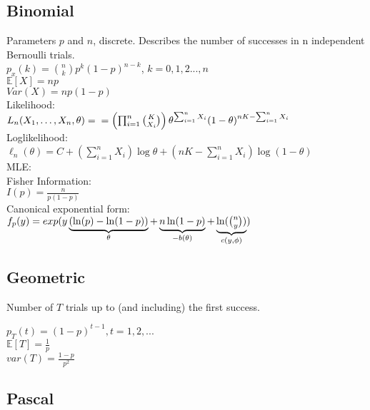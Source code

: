 \subsection*{Binomial}
Parameters $p$ and $n$, discrete. Describes the number of successes
in n independent Bernoulli trials.\\

$p_x(k) = {\binom{n}{k}} {p}^{k} (1-p )^{n-k}$, $k=0,1,2..., n$\\

$\mathbb{E}[X]=np$\\

$Var(X)= np(1-p)$ \\

Likelihood:\\

$\displaystyle  L_ n(X_1, \ldots , X_ n, \theta ) =\\
= \left( \prod _{i = 1}^ n \binom {K}{X_ i} \right) \theta ^{\sum _{i = 1}^ n X_ i} (1 - \theta )^{nK - \sum _{i = 1}^ n X_ i }$\\

Loglikelihood:\\

$\ell_n (\theta) = C + \left( \sum _{i = 1}^ n X_ i \right) \log \theta + \left( nK - \sum _{i = 1}^ n X_ i \right) \log (1 - \theta )$\\

MLE:\\


Fisher Information:\\

$I(p) = \frac{n}{p(1-p)}$\\

Canonical exponential form:\\

$f_ p(y) =\\  
exp (y \underbrace{(\ln (p)-\ln (1-p))}_{\theta } + \underbrace{n\ln (1-p)}_{-b(\theta )} +\underbrace{\ln(\binom {n}{y})}_{c(y,\phi )} )$

\subsection*{Geometric}
Number of $T$ trials up to (and including) the first success. 

$p_T(t) = (1-p)^{t-1}, t=1,2,...$\\
$\mathbb{E}[T]=\frac{1}{p}$\\
$var(T)=\frac{1-p}{p^2}$

\subsection*{Pascal}

